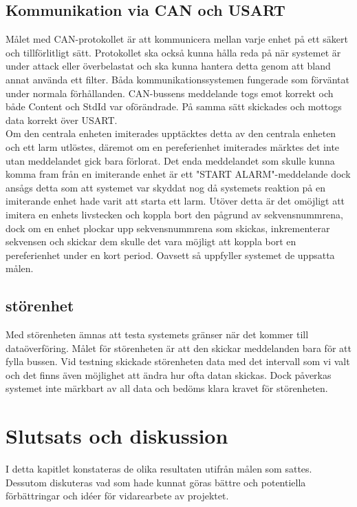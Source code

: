 \documentclass{article}
\begin{document}
\subsection{Kommunikation via CAN och USART}
Målet med CAN-protokollet är att kommunicera mellan varje enhet på ett säkert och tillförlitligt sätt. Protokollet ska också kunna hålla reda på när systemet är under attack eller överbelastat och ska kunna hantera detta genom att bland annat använda ett filter. Båda kommunikationssystemen fungerade som förväntat under normala förhållanden. CAN-bussens meddelande togs emot korrekt och både Content och StdId var oförändrade. På samma sätt skickades och mottogs data korrekt över USART. 
\\
Om den centrala enheten imiterades upptäcktes detta av den centrala enheten och ett larm utlöstes, däremot om en pereferienhet imiterades märktes det inte utan meddelandet gick bara förlorat. Det enda meddelandet som skulle kunna komma fram från en imiterande enhet är ett "START ALARM"-meddelande dock ansågs detta som att systemet var skyddat nog då systemets reaktion på en imiterande enhet hade varit att starta ett larm. Utöver detta är det omöjligt att imitera en enhets livstecken och koppla bort den pågrund av sekvensnummrena, dock om en enhet plockar upp sekvensnummrena som skickas, inkrementerar sekvensen och skickar dem skulle det vara möjligt att koppla bort en pereferienhet under en kort period. Oavsett så uppfyller systemet de uppsatta målen.

\subsection{störenhet}
Med störenheten ämnas att testa systemets gränser när det kommer till dataöverföring. 
Målet för störenheten är att den skickar meddelanden bara för att fylla bussen. 
Vid testning skickade störenheten data med det intervall som vi valt och det finns även möjlighet att ändra hur ofta datan skickas.
Dock påverkas systemet inte märkbart av all data och bedöms klara kravet för störenheten.

\section{Slutsats och diskussion}
I detta kapitlet konstateras de olika resultaten utifrån målen som sattes.
Dessutom diskuteras vad som hade kunnat göras bättre och potentiella förbättringar och idéer för vidarearbete av projektet.\\
\\
\end{document}
